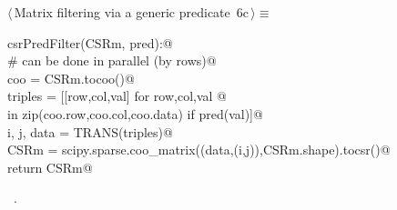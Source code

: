 \documentclass[11pt,oneside]{article}	%
\begin{document}
\begin{flushleft} \small
\begin{minipage}{\linewidth} \label{scrap15}
\protect{}$\langle\,$Matrix filtering via a generic predicate\nobreak\ {\footnotesize 6c}$\,\rangle\equiv$
\vspace{-1ex}
\begin{list}{}{} \item
\mbox{}\verb@def csrPredFilter(CSRm, pred):@\\
\mbox{}\verb@   # can be done in parallel (by rows)@\\
\mbox{}\verb@   coo = CSRm.tocoo()@\\
\mbox{}\verb@   triples = [[row,col,val] for row,col,val @\\
\mbox{}\verb@            in zip(coo.row,coo.col,coo.data) if pred(val)]@\\
\mbox{}\verb@   i, j, data = TRANS(triples)@\\
\mbox{}\verb@   CSRm = scipy.sparse.coo_matrix((data,(i,j)),CSRm.shape).tocsr()@\\
\mbox{}\verb@   return CSRm@\\
\mbox{}\verb@@{\NWsep}
\end{list}
\vspace{-1ex}
\footnotesize\addtolength{\baselineskip}{-1ex}
\begin{list}{}{\setlength{\itemsep}{-\parsep}\setlength{\itemindent}{-\leftmargin}}
\item \NWtxtMacroRefIn\ .
\end{list}
\end{minipage}\\[4ex]
\end{flushleft}
\end{document}
